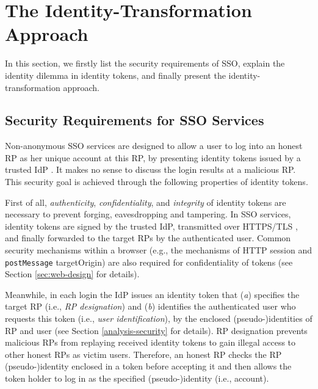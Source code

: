 \section{The Identity-Transformation Approach}
\label{sec:challenge}

In this section,
    we firstly list the security requirements of SSO,
        explain the identity dilemma in identity tokens,
        and finally present the identity-transformation approach.

\subsection{Security Requirements for SSO Services}
\label{subsec:basicrequirements}

Non-anonymous SSO services are designed to allow a user to log into an honest RP as her unique account at this RP, %
by presenting identity tokens issued by a trusted IdP   \cite{OpenIDConnect,rfc6749,SAML,SAMLIdentifier,NIST2017draft}.
It makes no sense to discuss the login results at a malicious RP. 
This security goal is achieved through the following properties of identity tokens.

First of all, \emph{authenticity}, \emph{confidentiality}, and \emph{integrity} of identity tokens are necessary to prevent forging, eavesdropping and tampering.
In SSO services, identity tokens are signed by the trusted IdP,
    transmitted over HTTPS/TLS \cite{OpenIDConnect, rfc6749, SAML},
    and finally forwarded to the target RPs by the authenticated user.
Common security mechanisms within a browser (e.g., the mechanisms of HTTP session and \verb+postMessage+ targetOrigin)
are also required for confidentiality of tokens \cite{GoogleIdIntegrate,de2014oauth,FettKS14,BrowserID} (see Section \ref{sec:web-design} for details).

Meanwhile, in each login the IdP issues an identity token that (\emph{a}) specifies the target RP (i.e., \emph{RP designation}) and (\emph{b}) identifies the authenticated user who requests this token (i.e., \emph{user identification}),
        by the enclosed (pseudo-)identities of RP and user \cite{OpenIDConnect,rfc6749,SAML} (see Section \ref{analysis-security} for details).
RP designation prevents malicious RPs from replaying received identity tokens to gain illegal access to other honest RPs as victim users.
Therefore, an honest RP checks the RP (pseudo-)identity enclosed in a token before accepting it 
\cite{OpenIDConnect,BrowserID,SPRESSO,NIST2017draft,POIDC,save-flow,up-sso,miso}
 and then allows the token holder to log in as the specified (pseudo-)identity (i.e., account).

